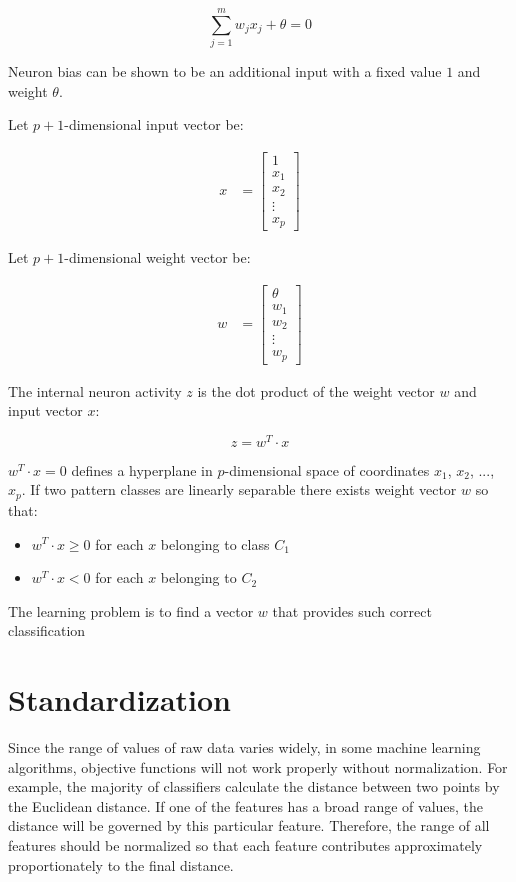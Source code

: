 $$
\sum_{j=1}^{m} w_j x_j + \theta = 0
$$

Neuron bias can be shown to be an additional input with a fixed value $1$ and weight $\theta$.

Let $p+1$-dimensional input vector be:

\begin{align}
x &= \begin{bmatrix}
    1 \\
    x_{1} \\
    x_{2} \\
    \vdots \\
    x_{p}
    \end{bmatrix}
\end{align}

Let $p+1$-dimensional weight vector be:

\begin{align}
w &= \begin{bmatrix}
    \theta \\
    w_{1} \\
    w_{2} \\
    \vdots \\
    w_{p}
    \end{bmatrix}
\end{align}

The internal neuron activity $z$ is the dot product of the weight vector $w$ and input vector $x$:

$$
z = w^T \cdot x
$$

$w^T \cdot x = 0$ defines a hyperplane in $p$-dimensional space of coordinates $x_1$, $x_2$, ..., $x_p$. If two pattern classes are linearly separable there exists weight vector $w$ so that:

\begin{itemize}
    \item $w^T \cdot x \geq 0$ for each $x$ belonging to class $C_1$
    \item $w^T \cdot x < 0$ for each $x$ belonging to $C_2$
\end{itemize}

The learning problem is to find a vector $w$ that provides such correct classification

\section{Standardization}

Since the range of values of raw data varies widely, in some machine learning algorithms, objective functions will not work properly without normalization. For example, the majority of classifiers calculate the distance between two points by the Euclidean distance. If one of the features has a broad range of values, the distance will be governed by this particular feature. Therefore, the range of all features should be normalized so that each feature contributes approximately proportionately to the final distance.

